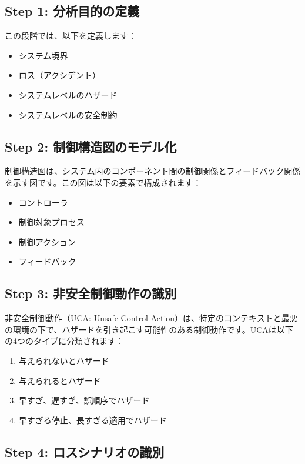 \subsection{Step 1: 分析目的の定義}

この段階では、以下を定義します：

\begin{itemize}
    \item システム境界
    \item ロス（アクシデント）
    \item システムレベルのハザード
    \item システムレベルの安全制約
\end{itemize}

\subsection{Step 2: 制御構造図のモデル化}

制御構造図は、システム内のコンポーネント間の制御関係とフィードバック関係を示す図です。この図は以下の要素で構成されます：

\begin{itemize}
    \item コントローラ
    \item 制御対象プロセス
    \item 制御アクション
    \item フィードバック
\end{itemize}

\subsection{Step 3: 非安全制御動作の識別}

非安全制御動作（UCA: Unsafe Control Action）は、特定のコンテキストと最悪の環境の下で、ハザードを引き起こす可能性のある制御動作です。UCAは以下の4つのタイプに分類されます：

\begin{enumerate}
    \item 与えられないとハザード
    \item 与えられるとハザード
    \item 早すぎ、遅すぎ、誤順序でハザード
    \item 早すぎる停止、長すぎる適用でハザード
\end{enumerate}

\subsection{Step 4: ロスシナリオの識別}

